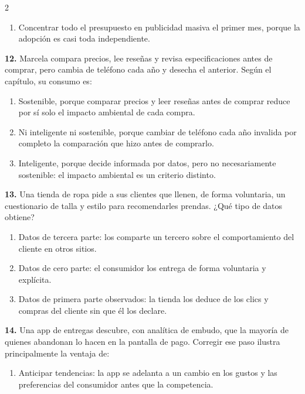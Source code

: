 \documentclass[10pt,letterpaper]{article}
\begin{document}
\begin{multicols}{2}
\begin{enumerate}[label=\alph*),leftmargin=1.1em,itemsep=0pt,topsep=1pt,parsep=0pt,partopsep=0pt]
\item Concentrar todo el presupuesto en publicidad masiva el primer mes, porque la adopción es casi toda independiente.
\end{enumerate}
\vspace{2pt}
\noindent\textbf{12.} Marcela compara precios, lee reseñas y revisa especificaciones antes de comprar, pero cambia de teléfono cada año y desecha el anterior. Según el capítulo, su consumo es:
\vspace{-3pt}
\begin{enumerate}[label=\alph*),leftmargin=1.1em,itemsep=0pt,topsep=1pt,parsep=0pt,partopsep=0pt]
\item Sostenible, porque comparar precios y leer reseñas antes de comprar reduce por sí solo el impacto ambiental de cada compra.
\item Ni inteligente ni sostenible, porque cambiar de teléfono cada año invalida por completo la comparación que hizo antes de comprarlo.
\item Inteligente, porque decide informada por datos, pero no necesariamente sostenible: el impacto ambiental es un criterio distinto.
\end{enumerate}
\vspace{2pt}
\noindent\textbf{13.} Una tienda de ropa pide a sus clientes que llenen, de forma voluntaria, un cuestionario de talla y estilo para recomendarles prendas. ¿Qué tipo de datos obtiene?
\vspace{-3pt}
\begin{enumerate}[label=\alph*),leftmargin=1.1em,itemsep=0pt,topsep=1pt,parsep=0pt,partopsep=0pt]
\item Datos de tercera parte: los comparte un tercero sobre el comportamiento del cliente en otros sitios.
\item Datos de cero parte: el consumidor los entrega de forma voluntaria y explícita.
\item Datos de primera parte observados: la tienda los deduce de los clics y compras del cliente sin que él los declare.
\end{enumerate}
\vspace{2pt}
\noindent\textbf{14.} Una app de entregas descubre, con analítica de embudo, que la mayoría de quienes abandonan lo hacen en la pantalla de pago. Corregir ese paso ilustra principalmente la ventaja de:
\vspace{-3pt}
\begin{enumerate}[label=\alph*),leftmargin=1.1em,itemsep=0pt,topsep=1pt,parsep=0pt,partopsep=0pt]
\item Anticipar tendencias: la app se adelanta a un cambio en los gustos y las preferencias del consumidor antes que la competencia.

\end{enumerate}
\end{multicols}
\end{document}
